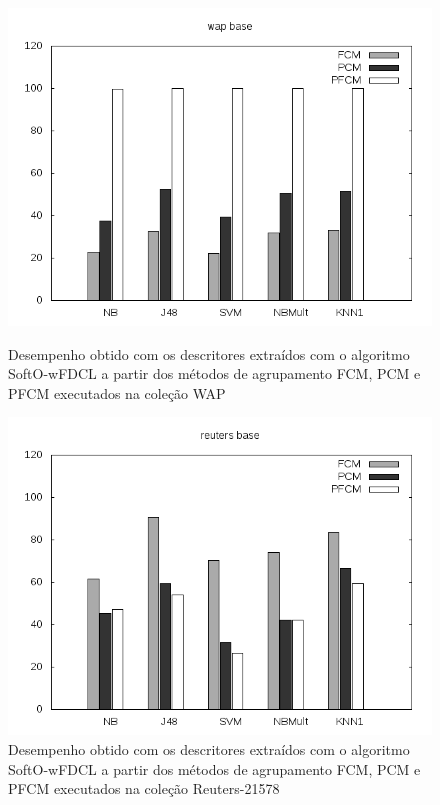 \begin{figure}[!htp] \centering 
   \begin{minipage}{0.45\textwidth} 
     \centering
    \includegraphics[width=1.0\columnwidth]{assets/pfcm/wap} 
    \caption{Desempenho obtido com os descritores extraídos com o algoritmo SoftO-wFDCL a partir dos
      métodos de agrupamento FCM,
    PCM e PFCM executados na coleção WAP} 
    \label{fig:pfcmwap}
  \end{minipage}\hfill 
  \begin{minipage}{0.45\textwidth} \centering
    \includegraphics[width=1.0\columnwidth]{assets/pfcm/reuters} 
    \caption{Desempenho obtido com os descritores extraídos com o algoritmo SoftO-wFDCL a partir dos
      métodos de agrupamento FCM,
    PCM e PFCM executados na coleção Reuters-21578} 
     \label{fig:pfcmreuters} 
   \end{minipage} 
\end{figure}

